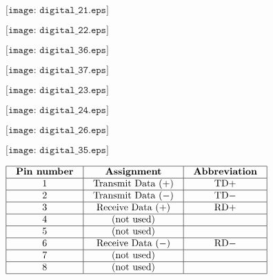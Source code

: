 \documentclass[12pt,a4paper,margin=2cm]{book}
\def\lthtmlcheckvsize{\ifdim\ht\sizebox<\vsize 
  \ifdim\wd\sizebox<\hsize\expandafter\hfill\fi \expandafter\vfill
  \else\expandafter\vss\fi}%
\begin{document}
{\newpage\clearpage
{}%
$\displaystyle \texttt{[image: digital\_21.eps]}$%
\lthtmlindisplaymathZ
\lthtmlcheckvsize\clearpage}

{\newpage\clearpage
{}%
$\displaystyle \texttt{[image: digital\_22.eps]}$%
\lthtmlindisplaymathZ
\lthtmlcheckvsize\clearpage}

{\newpage\clearpage
{}%
$\displaystyle \texttt{[image: digital\_36.eps]}$%
\lthtmlindisplaymathZ
\lthtmlcheckvsize\clearpage}

{\newpage\clearpage
{}%
$\displaystyle \texttt{[image: digital\_37.eps]}$%
\lthtmlindisplaymathZ
\lthtmlcheckvsize\clearpage}

{\newpage\clearpage
{}%
$\displaystyle \texttt{[image: digital\_23.eps]}$%
\lthtmlindisplaymathZ
\lthtmlcheckvsize\clearpage}

{\newpage\clearpage
{}%
$\displaystyle \texttt{[image: digital\_24.eps]}$%
\lthtmlindisplaymathZ
\lthtmlcheckvsize\clearpage}

{\newpage\clearpage
{}%
$\displaystyle \texttt{[image: digital\_26.eps]}$%
\lthtmlindisplaymathZ
\lthtmlcheckvsize\clearpage}

{\newpage\clearpage
{}%
$\displaystyle \texttt{[image: digital\_35.eps]}$%
\lthtmlindisplaymathZ
\lthtmlcheckvsize\clearpage}

{\newpage\clearpage
{}%
$\displaystyle \vbox{\offinterlineskip
\halign{\strut
\vrule \quad\hfil # \  \hfil & 
\vrule \quad\hfil # \  \hfil & 
\vrule \quad\hfil # \  \hfil \vrule \cr
\noalign{\hrule }
\textbf{Pin number} & \textbf{Assignment} & \textbf{Abbreviation} \cr
\noalign{\hrule }
1 & Transmit Data (+) & TD+ \cr
\noalign{\hrule }
2 & Transmit Data ($-$) & TD$-$ \cr
\noalign{\hrule }
3 & Receive Data (+) & RD+ \cr
\noalign{\hrule }
4 & (not used) &  \cr
\noalign{\hrule }
5 & (not used) &  \cr
\noalign{\hrule }
6 & Receive Data ($-$) & RD$-$ \cr
\noalign{\hrule }
7 & (not used) &  \cr
\noalign{\hrule }
8 & (not used) &  \cr
\noalign{\hrule }
} %
}$%
\lthtmlindisplaymathZ
\lthtmlcheckvsize\clearpage}
\end{document}
